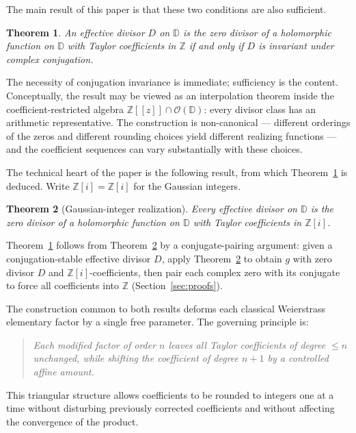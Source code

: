 \documentclass[12pt]{amsart}
\newtheorem{theorem}{Theorem}
\theoremstyle{definition}
\newcommand{\D}{\mathbb{D}}
\newcommand{\Z}{\mathbb{Z}}
\newcommand{\Zi}{\mathbb{Z}[i]}
\newcommand{\OD}{\mathcal{O}(\D)}
\begin{document}
The main result of this paper is that these two conditions are also
sufficient.

\begin{theorem}
\label{thm:main}
An effective divisor $D$ on $\D$ is the zero divisor of a holomorphic
function on $\D$ with Taylor coefficients in $\Z$ if and only if $D$
is invariant under complex conjugation.
\end{theorem}

The necessity of conjugation invariance is immediate; sufficiency is
the content.  Conceptually, the result may be viewed as an
interpolation theorem inside the coefficient-restricted algebra
$\Z[[z]] \cap \OD$: every divisor class has an arithmetic
representative.  The construction is non-canonical — different
orderings of the zeros and different rounding choices yield different
realizing functions — and the coefficient sequences can vary
substantially with these choices.

The technical heart of the paper is the following result, from which
Theorem~\ref{thm:main} is deduced.  Write $\Zi = \Z[i]$ for the
Gaussian integers.

\begin{theorem}[Gaussian-integer realization]
\label{prop:Zi}
Every effective divisor on $\D$ is the zero divisor of a holomorphic
function on $\D$ with Taylor coefficients in $\Zi$.
\end{theorem}

Theorem~\ref{thm:main} follows from Theorem~\ref{prop:Zi} by a
conjugate-pairing argument: given a conjugation-stable effective
divisor $D$, apply Theorem~\ref{prop:Zi} to obtain $g$ with zero
divisor $D$ and $\Zi$-coefficients, then pair each complex zero with
its conjugate to force all coefficients into $\Z$
(Section~\ref{sec:proofs}).

The construction common to both results deforms each classical Weierstrass
elementary factor by a single free parameter.  The governing principle is:

\begin{quote}
\emph{Each modified factor of order $n$ leaves all Taylor coefficients
of degree $\leq n$ unchanged, while shifting the coefficient of
degree $n+1$ by a controlled affine amount.}
\end{quote}

This triangular structure allows coefficients to be rounded to integers
one at a time without disturbing previously corrected coefficients and
without affecting the convergence of the product.
\end{document}
